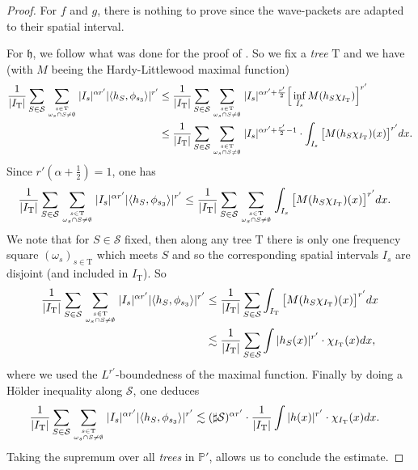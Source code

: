 \documentclass[a4paper,11pt,oneside]{amsart}
\newcommand{\hh}{\mathfrak{h}}
\newcommand{\PP}{\mathbb{P}}
\newcommand{\TT}{\mathrm{T}}
\theoremstyle{plain}
\theoremstyle{definition}
\begin{document}
\begin{proof} For $f$ and $g$, there is nothing to prove since the wave-packets are adapted to their spatial interval.

For $\hh$, we follow  what was done for the proof of \cite[Proposition 2.5]{BB}.
So we fix a {\it tree} $\TT$ and we have (with $M$ beeing the Hardy-Littlewood maximal function)
\begin{align*}
\frac{1}{|I_{\TT}|} \sum_{S\in{\mathcal S}} \sum_{s\in \TT \atop \omega_s\cap S \neq \emptyset} |I_s|^{\alpha r'} |\langle h_S,\phi_{s_3}\rangle|^{r'} & \leq  \frac{1}{|I_{\TT}|} \sum_{S\in{\mathcal S}} \sum_{s\in \TT \atop \omega_s\cap S \neq \emptyset} |I_s|^{\alpha r' + \frac{r'}{2}} \Big[\inf_{I_s}  M(h_S \chi_{I_{\TT}})\Big]^{r'} \\
& \leq  \frac{1}{|I_{\TT}|} \sum_{S\in{\mathcal S}} \sum_{s\in \TT \atop \omega_s\cap S \neq \emptyset} |I_s|^{\alpha r' + \frac{r'}{2}-1}  \cdot \int_{I_s} \big[M(h_S \chi_{I_{\TT}})(x)\big]^{r'} dx.
\end{align*}
Since $r'(\alpha+\frac{1}{2})=1$, one has 
\begin{align*}
\frac{1}{|I_{\TT}|} \sum_{S\in{\mathcal S}} \sum_{s\in \TT \atop \omega_s\cap S \neq \emptyset} |I_s|^{\alpha r'} |\langle h_S,\phi_{s_3}\rangle|^{r'} &  \leq  \frac{1}{|I_{\TT}|} \sum_{S\in{\mathcal S}} \sum_{s\in \TT \atop \omega_s\cap S \neq \emptyset} \int_{I_s} \big[M(h_S \chi_{I_{\TT}})(x)\big]^{r'} dx.
\end{align*}
We note that for $S\in{\mathcal S}$ fixed, then along any tree $\TT$ there is only one frequency square $(\omega_s)_{s\in \TT}$ which meets $S$ and so the corresponding spatial intervals $I_s$ are disjoint (and included in $I_{\TT}$). So
\begin{align*}
\frac{1}{|I_{\TT}|} \sum_{S\in{\mathcal S}} \sum_{s\in \TT \atop \omega_s\cap S \neq \emptyset} |I_s|^{\alpha r'} |\langle h_S,\phi_{s_3}\rangle|^{r'} &  \leq  \frac{1}{|I_{\TT}|} \sum_{S\in{\mathcal S}} \int_{I_{\TT}} \big[M(h_S \chi_{I_{\TT}})(x)\big]^{r'} dx \\
& \lesssim  \frac{1}{|I_{\TT}|} \sum_{S\in{\mathcal S}} \int |h_S(x)|^{r'} \cdot \chi_{I_{\TT}}(x) dx,
\end{align*}
where we used the $L^{r'}$-boundedness of the maximal function. Finally by doing a H\"older inequality along ${\mathcal S}$, one deduces 
\begin{align*}
\frac{1}{|I_{\TT}|} \sum_{S\in{\mathcal S}} \sum_{s\in \TT \atop \omega_s\cap S \neq \emptyset} |I_s|^{\alpha r'} |\langle h_S,\phi_{s_3}\rangle|^{r'} & \lesssim (\sharp {\mathcal S})^{\alpha r'} \cdot \frac{1}{|I_{\TT}|}  \int |h(x)|^{r'} \cdot \chi_{I_{\TT}}(x) dx.
\end{align*}
Taking the supremum over all {\it trees} in $\PP'$, allows us to conclude the estimate.
\end{proof}
\end{document}
